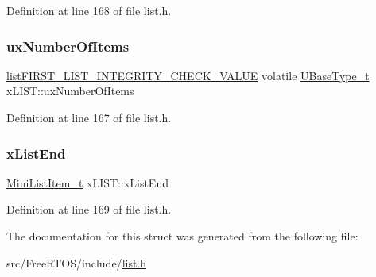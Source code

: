 Definition at line 168 of file list.\+h.

\mbox{\label{structx_l_i_s_t_aa280e17bf4e71f81c449c2444cb70378}} 
\subsubsection{\texorpdfstring{ux\+Number\+Of\+Items}{uxNumberOfItems}}
{\footnotesize\ttfamily \hyperlink{list_8h_a3a52b5a4f70d3a07e37a5814a23ba880}{list\+F\+I\+R\+S\+T\+\_\+\+L\+I\+S\+T\+\_\+\+I\+N\+T\+E\+G\+R\+I\+T\+Y\+\_\+\+C\+H\+E\+C\+K\+\_\+\+V\+A\+L\+UE} volatile \hyperlink{portmacro_8h_a646f89d4298e4f5afd522202b11cb2e6}{U\+Base\+Type\+\_\+t} x\+L\+I\+S\+T\+::ux\+Number\+Of\+Items}



Definition at line 167 of file list.\+h.

\mbox{\label{structx_l_i_s_t_a49ad62fa153126e27e273811167b336a}} 
\subsubsection{\texorpdfstring{x\+List\+End}{xListEnd}}
{\footnotesize\ttfamily \hyperlink{list_8h_a542a8d55e98bc407593979e61f83cd02}{Mini\+List\+Item\+\_\+t} x\+L\+I\+S\+T\+::x\+List\+End}



Definition at line 169 of file list.\+h.



The documentation for this struct was generated from the following file\+:\begin{DoxyCompactItemize}
\item 
src/\+Free\+R\+T\+O\+S/include/\hyperlink{list_8h}{list.\+h}\end{DoxyCompactItemize}

